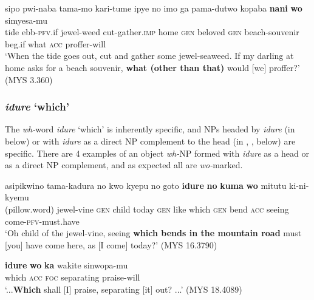 \documentclass[output=paper]{LSP/langsci}
\begin{document}
\begin{exe}
\ex%
\label{07-fr-ex:27}
\gll sipo pwi-naba tama-mo kari-tume ipye no imo ga pama-dutwo kopaba \textbf{nani} \textbf{wo} simyesa-mu\\
tide ebb-\textsc{pfv}.if jewel-weed cut-gather.\textsc{imp} home \textsc{gen} beloved \textsc{gen} beach-souvenir beg.if  what \textsc{acc} proffer-will\\
\glt ‘When the tide goes out, cut and gather some jewel-seaweed. If my darling at home asks for a beach souvenir, \textbf{what (other than that)} would [we] proffer?’  (MYS 3.360)
\end{exe}

\subsubsection{\textit{idure} ‘which’}
\label{07-subsubsec:2-2-4}

The \textit{wh-}word \textit{idure} ‘which’ is inherently specific, and NPs headed by \textit{idure} (\eg in  below) or with \textit{idure} as a direct NP complement to the head (\eg in , ,  below) are specific. There are 4 examples of an object \textit{wh-}NP formed with \textit{idure} as a head or as a direct NP complement, and as expected all are \textit{wo-}marked.


\begin{exe}
\ex%
\label{07-fr-ex:28}
\gll asipikwino tama-kadura no kwo kyepu no goto \textbf{idure} \textbf{no} \textbf{kuma} \textbf{wo} mitutu ki-ni-kyemu\\
(pillow.word) jewel-vine \textsc{gen} child today \textsc{gen} like which \textsc{gen}  bend \textsc{acc}  seeing come-\textsc{pfv}-must.have\\
\glt ‘Oh child of the jewel-vine, seeing \textbf{which bends in the mountain road} must [you] have come here, as [I come] today?’ (MYS 16.3790)
\end{exe}

\begin{exe}
\ex%
\label{07-fr-ex:29}
\gll \textbf{idure} \textbf{wo} \textbf{ka} wakite sinwopa-mu\\
 which \textsc{acc} \textsc{foc}  separating praise-will\\
\glt ‘...\textbf{Which} shall [I] praise, separating [it] out? ...’   (MYS 18.4089)
\end{exe}

\end{document}
